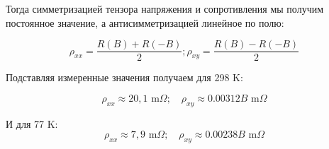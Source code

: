 \documentclass[a4paper, 12pt]{article}
\begin{document}
Тогда симметризацией тензора напряжения и сопротивления мы получим постоянное значение, а антисимметризацией линейное по полю:

$$ \rho_{xx}=\frac{R(B)+R(-B)}{2};\rho_{xy}=\frac{R(B)-R(-B)}{2}$$

Подставляя измеренные значения получаем для 298 K:

$$\rho_{xx}\approx 20,1 \text{ m$\Omega$}; \quad \rho_{xy}\approx0.00312B \text{ m$\Omega$}$$

И для 77 K:
$$\rho_{xx}\approx7,9 \text{ m$\Omega$}; \quad \rho_{xy}\approx0.00238B \text{ m$\Omega$}$$
\end{document}
